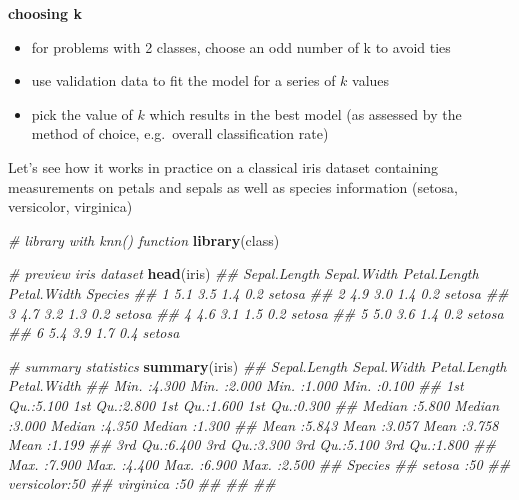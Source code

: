 \documentclass[
]{book}
\newenvironment{Shaded}{\begin{snugshade}}{\end{snugshade}}
\newcommand{\CommentTok}[1]{\textcolor[rgb]{0.56,0.35,0.01}{\textit{#1}}}
\newcommand{\KeywordTok}[1]{\textcolor[rgb]{0.13,0.29,0.53}{\textbf{#1}}}
\newcommand{\NormalTok}[1]{#1}
\providecommand{\tightlist}{%
  \setlength{\itemsep}{0pt}\setlength{\parskip}{0pt}}
\theoremstyle{definition}
\theoremstyle{definition}
\theoremstyle{definition}
\theoremstyle{remark}
\begin{document}
\textbf{choosing k}

\begin{itemize}
\tightlist
\item
  for problems with 2 classes, choose an odd number of k to avoid ties
\item
  use validation data to fit the model for a series of \(k\) values
\item
  pick the value of \(k\) which results in the best model (as assessed by the method of choice, e.g.~overall classification rate)
\end{itemize}

Let's see how it works in practice on a classical iris dataset containing measurements on petals and sepals as well as species information (setosa, versicolor, virginica)

\begin{Shaded}
\begin{Highlighting}[]
\CommentTok{\# library with knn() function}
\KeywordTok{library}\NormalTok{(class)}

\CommentTok{\# preview iris dataset}
\KeywordTok{head}\NormalTok{(iris)}
\CommentTok{\#\#   Sepal.Length Sepal.Width Petal.Length Petal.Width Species}
\CommentTok{\#\# 1          5.1         3.5          1.4         0.2  setosa}
\CommentTok{\#\# 2          4.9         3.0          1.4         0.2  setosa}
\CommentTok{\#\# 3          4.7         3.2          1.3         0.2  setosa}
\CommentTok{\#\# 4          4.6         3.1          1.5         0.2  setosa}
\CommentTok{\#\# 5          5.0         3.6          1.4         0.2  setosa}
\CommentTok{\#\# 6          5.4         3.9          1.7         0.4  setosa}

\CommentTok{\# summary statistics}
\KeywordTok{summary}\NormalTok{(iris)}
\CommentTok{\#\#   Sepal.Length    Sepal.Width     Petal.Length    Petal.Width   }
\CommentTok{\#\#  Min.   :4.300   Min.   :2.000   Min.   :1.000   Min.   :0.100  }
\CommentTok{\#\#  1st Qu.:5.100   1st Qu.:2.800   1st Qu.:1.600   1st Qu.:0.300  }
\CommentTok{\#\#  Median :5.800   Median :3.000   Median :4.350   Median :1.300  }
\CommentTok{\#\#  Mean   :5.843   Mean   :3.057   Mean   :3.758   Mean   :1.199  }
\CommentTok{\#\#  3rd Qu.:6.400   3rd Qu.:3.300   3rd Qu.:5.100   3rd Qu.:1.800  }
\CommentTok{\#\#  Max.   :7.900   Max.   :4.400   Max.   :6.900   Max.   :2.500  }
\CommentTok{\#\#        Species  }
\CommentTok{\#\#  setosa    :50  }
\CommentTok{\#\#  versicolor:50  }
\CommentTok{\#\#  virginica :50  }
\CommentTok{\#\#                 }
\CommentTok{\#\#                 }
\CommentTok{\#\# }


\end{Highlighting}
\end{Shaded}
\end{document}
